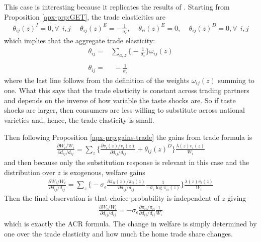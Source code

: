 \documentclass[12pt,pdftex]{article}
\begin{document}
\begin{onehalfspacing}
This case is interesting because it replicates the results of \citet{arkolakis2012new}. Starting from Proposition \ref{apx-prp:GET}, the trade elasticities are
\begin{align}
\nonumber
\theta_{ij}(z)^{I} = 0, \forall \ \ i,j \ \ \ \ \ \ \theta_{ij}(z)^{E} = -\frac{1}{\sigma_{\epsilon}}, \ \ \ \ \ \theta_{ii}(z)^{E} = 0, \ \ \ \ \
\theta_{ij}(z)^{D} = 0, \forall \ \ i,j
\end{align}
which implies that the aggregate trade elasticity:
\begin{align}
\nonumber
\theta_{ij} =& \sum_{a,z} \bigg \{  -\frac{1}{\sigma_{\epsilon}}  \bigg \}\omega_{ij}(z) \nonumber \\
\nonumber \\
\theta_{ij} =& \ \ -\frac{1}{\sigma_{\epsilon}}
\end{align}
where the last line follows from the definition of the weights $\omega_{ij}(z)$ summing to one. What this says that the trade elasticity is constant across trading partners and depends on the inverse of how variable the taste shocks are. So if taste shocks are larger, then consumers are less willing to substitute across national varieties and, hence, the trade elasticity is small.

Then following Proposition \ref{apx-prp:gains-trade} the gains from trade formula is
\begin{align}
\frac{\partial W_{i} / W_{i}}{\partial d_{ij} / d_{ij}} = \sum_{z} \bigg \{ \frac{\partial v_i(z) / v_{i}(z)}{\partial d_{ij} / d_{ij}}  +  \theta_{ij}(z)^{D}\bigg \} \frac{\lambda(z)v_{i}(z)}{W_{i}}
\end{align}
and then because only the substitution response is relevant in this case and the distribution over $z$ is exogenous, welfare gains
\begin{align}
\frac{\partial W_{i} / W_{i}}{\partial d_{ij} / d_{ij}} = \sum_{z} \bigg \{ -\sigma_{\epsilon} \frac{\partial \pi_{ii}(z) / \pi_{ii}(z)}{\partial d_{ij} / d_{ij}}  \frac{1}{-\sigma_{\epsilon}\log \pi_{ii}(z)} \bigg \} \frac{\lambda(z)v_{i}(z)}{W_{i}}
\end{align}
Then the final observation is that choice probability is independent of $z$ giving
\begin{align}
\frac{\partial W_{i} / W_{i}}{\partial d_{ij} / d_{ij}} = -\sigma_{\epsilon} \frac{\partial \pi_{ii} / \pi_{ii}}{\partial d_{ij} / d_{ij}}  \frac{1}{W_i}
\end{align}
which is exactly the ACR formula. The change in welfare is simply determined by one over the trade elasticity and how much the home trade share changes.


\end{onehalfspacing}
\end{document}
